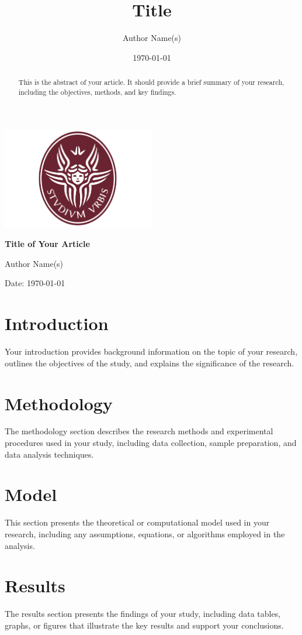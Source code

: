 \documentclass{article}
\title{Title}
\author{Author Name(s)}
\date{\today}
\begin{document}
\begin{titlepage}
    \centering
    \includegraphics[width=0.5\textwidth]{../assets/sapienza_logo.png} 
    \vfill
    {\bfseries\Large
        Title of Your Article\par
    }
    \vfill
    {\Large
        Author Name(s)\par
    }
    \vfill
    {\large
        Date: \today\par
    }
\end{titlepage}

\begin{abstract}
This is the abstract of your article. It should provide a brief summary of your research, including the objectives, methods, and key findings.
\end{abstract}

\section{Introduction}
\lipsum[1]
Your introduction provides background information on the topic of your research, outlines the objectives of the study, and explains the significance of the research.

\section{Methodology}
\lipsum[2]
The methodology section describes the research methods and experimental procedures used in your study, including data collection, sample preparation, and data analysis techniques.

\section{Model}
\lipsum[3]
This section presents the theoretical or computational model used in your research, including any assumptions, equations, or algorithms employed in the analysis.

\section{Results}
\lipsum[4]
The results section presents the findings of your study, including data tables, graphs, or figures that illustrate the key results and support your conclusions.
\end{document}
